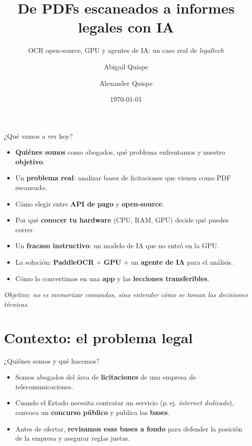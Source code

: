 \documentclass[10pt,aspectratio=169]{beamer}
\title[OCR + IA para legaltech]{De PDFs escaneados a informes legales con IA}
\subtitle{OCR open-source, GPU y agentes de IA: un caso real de \emph{legaltech}}
\author[A. Quispe \& A. Quispe]{Abigail Quispe \and Alexander Quispe}
\institute[UP]{\footnotesize abigail.quispe@pucp.edu.pe \quad$\cdot$\quad aquisper@caltech.edu\\[4pt]\normalsize Universidad del Pacífico}
\date{\today}
\begin{document}
\begin{frame}\titlepage\end{frame}

\begin{frame}{¿Qué vamos a ver hoy?}
  \begin{itemize}
    \item \textbf{Quiénes somos} como abogados, qué problema enfrentamos y nuestro \textbf{objetivo}.
    \item Un \textbf{problema real}: analizar bases de licitaciones que vienen como PDF escaneado.
    \item Cómo elegir entre \textbf{API de pago} y \textbf{open-source}.
    \item Por qué \textbf{conocer tu hardware} (CPU, RAM, GPU) decide qué puedes correr.
    \item Un \textbf{fracaso instructivo}: un modelo de IA que no entró en la GPU.
    \item La solución: \textbf{PaddleOCR} + \textbf{GPU} + un \textbf{agente de IA} para el análisis.
    \item Cómo lo convertimos en una \textbf{app} y las \textbf{lecciones transferibles}.
  \end{itemize}
  \vfill
  \footnotesize\emph{Objetivo: no es memorizar comandos, sino entender cómo se toman las decisiones técnicas.}
\end{frame}

\section{Contexto: el problema legal}

\begin{frame}{¿Quiénes somos y qué hacemos?}
  \begin{itemize}
    \item Somos abogados del área de \textbf{licitaciones} de una empresa de telecomunicaciones.
    \item Cuando el Estado necesita contratar un servicio (p.\,ej. \emph{internet dedicado}), convoca un \textbf{concurso público} y publica las \textbf{bases}.
    \item Antes de ofertar, \textbf{revisamos esas bases a fondo} para defender la posición de la empresa y asegurar reglas justas.
  \end{itemize}
\end{frame}
\end{document}
